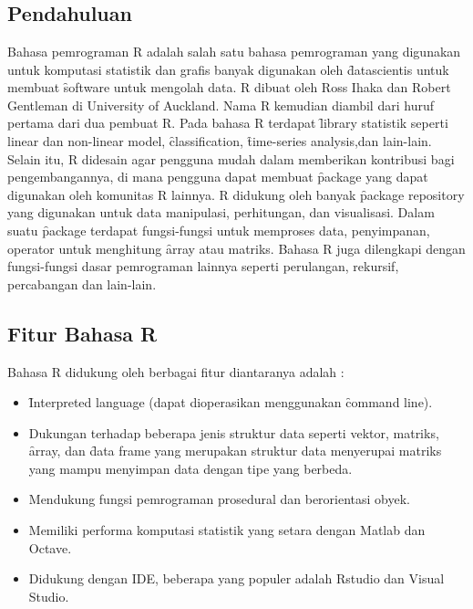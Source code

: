 \chapter{\topikSatu}

\section{Pendahuluan}

Bahasa pemrograman R adalah salah satu bahasa pemrograman yang digunakan untuk komputasi statistik dan grafis banyak digunakan oleh \f{datascientis} untuk membuat \f{software} untuk mengolah data. R dibuat oleh Ross Ihaka dan Robert Gentleman di University of Auckland. Nama  R kemudian diambil dari huruf pertama dari dua pembuat R.
Pada bahasa R terdapat \f{library} statistik seperti linear dan non-linear model, \f{classification}, \f{time-series­ analysis},dan lain-lain. Selain itu, R didesain agar pengguna mudah dalam memberikan kontribusi bagi pengembangannya, di mana pengguna dapat membuat \f{package} yang dapat digunakan oleh komunitas R lainnya.
R didukung oleh banyak \f{package repository} yang digunakan untuk data manipulasi, perhitungan, dan visualisasi. Dalam suatu \f{package} terdapat fungsi-fungsi untuk memproses data, penyimpanan, operator untuk menghitung \f{array} atau matriks. Bahasa R juga dilengkapi dengan fungsi-fungsi dasar pemrograman lainnya seperti perulangan, rekursif, percabangan dan lain-lain. 

\section{Fitur Bahasa R}

Bahasa R didukung oleh berbagai fitur diantaranya adalah :
\begin{itemize} 
\item \f{Interpreted language} (dapat dioperasikan menggunakan \f{command line}).
\item Dukungan terhadap beberapa jenis struktur data seperti vektor, matriks, \f{array}, dan \f{data frame} yang merupakan struktur data menyerupai matriks yang mampu menyimpan data dengan tipe yang berbeda.
\item Mendukung fungsi pemrograman prosedural dan berorientasi obyek.
\item Memiliki performa komputasi statistik yang setara dengan Matlab dan Octave.
\item Didukung dengan IDE, beberapa yang populer adalah Rstudio dan Visual Studio.
\end{itemize}

